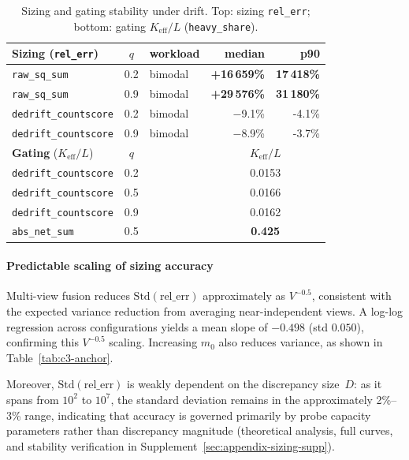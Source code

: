 \begin{table}[!thbp]
\caption{Sizing and gating stability under drift. Top: sizing \texttt{rel\_err}; bottom: gating $K_{\mathrm{eff}}/L$ (\texttt{heavy\_share}).}
\label{tab:c2-unified}
\centering
\small
\setlength{\tabcolsep}{3pt}

\begin{tabular}{@{}lclrr@{}}
\toprule
\textbf{Sizing (\texttt{rel\_err})} & $q$ & workload & median & p90 \\
\midrule
\texttt{raw\_sq\_sum}        & 0.2 & bimodal & \textbf{+16\,659\%} & \textbf{17\,418\%} \\
\texttt{raw\_sq\_sum}        & 0.9 & bimodal & \textbf{+29\,576\%} & \textbf{31\,180\%} \\
\texttt{dedrift\_countscore} & 0.2 & bimodal & $-$9.1\%   & -4.1\% \\
\texttt{dedrift\_countscore} & 0.9 & bimodal & $-$8.9\%   & -3.7\% \\
\midrule
\textbf{Gating} ($K_{\mathrm{eff}}/L$) & $q$ & & \multicolumn{2}{c}{$K_{\mathrm{eff}}/L$} \\
\midrule
\texttt{dedrift\_countscore} & 0.2 & & \multicolumn{2}{c}{0.0153} \\
\texttt{dedrift\_countscore} & 0.5 & & \multicolumn{2}{c}{0.0166} \\
\texttt{dedrift\_countscore} & 0.9 & & \multicolumn{2}{c}{0.0162} \\
\texttt{abs\_net\_sum}       & 0.5 & & \multicolumn{2}{c}{\textbf{0.425}} \\
\bottomrule
\end{tabular}
\end{table}

\paragraph{Predictable scaling of sizing accuracy}
Multi-view fusion reduces $\mathrm{Std(rel\_err)}$ approximately as $V^{-0.5}$, consistent with the expected variance reduction from averaging near-independent views. A log-log regression across configurations yields a mean slope of $-0.498$ (std $0.050$), confirming this $V^{-0.5}$ scaling.
Increasing $m_0$ also reduces variance, as shown in Table~\ref{tab:c3-anchor}.

Moreover, $\mathrm{Std(rel\_err)}$ is weakly dependent on the discrepancy size~$D$: as it spans from $10^2$ to
$10^7$, the standard deviation remains in the approximately 2\%--3\% range, indicating that accuracy is governed primarily by probe capacity parameters rather than discrepancy magnitude (theoretical analysis, full curves, and stability verification in Supplement~\ref{sec:appendix-sizing-supp}).

